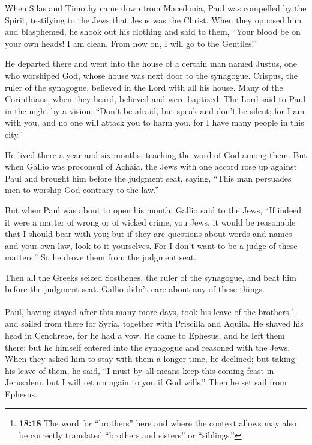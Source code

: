  When Silas and Timothy came down from Macedonia, Paul was
compelled by the Spirit, testifying to the Jews that Jesus was the
Christ.  When they opposed him and blasphemed, he shook
out his clothing and said to them, ``Your blood be on your own heads! I
am clean. From now on, I will go to the Gentiles!''

 He departed there and went into the house of a certain
man named Justus, one who worshiped God, whose house was next door to
the synagogue.  Crispus, the ruler of the synagogue,
believed in the Lord with all his house. Many of the Corinthians, when
they heard, believed and were baptized.  The Lord said to
Paul in the night by a vision, ``Don't be afraid, but speak and don't be
silent;  for I am with you, and no one will attack you to
harm you, for I have many people in this city.''

 He lived there a year and six months, teaching the word
of God among them.  But when Gallio was proconsul of
Achaia, the Jews with one accord rose up against Paul and brought him
before the judgment seat,  saying, ``This man persuades
men to worship God contrary to the law.''

 But when Paul was about to open his mouth, Gallio said
to the Jews, ``If indeed it were a matter of wrong or of wicked crime,
you Jews, it would be reasonable that I should bear with you;
 but if they are questions about words and names and your
own law, look to it yourselves. For I don't want to be a judge of these
matters.''  So he drove them from the judgment seat.

 Then all the Greeks seized Sosthenes, the ruler of the
synagogue, and beat him before the judgment seat. Gallio didn't care
about any of these things.

 Paul, having stayed after this many more days, took his
leave of the brothers,\footnote{\textbf{18:18} The word for ``brothers''
  here and where the context allows may also be correctly translated
  ``brothers and sisters'' or ``siblings.''} and sailed from there for
Syria, together with Priscilla and Aquila. He shaved his head in
Cenchreae, for he had a vow.  He came to Ephesus, and he
left them there; but he himself entered into the synagogue and reasoned
with the Jews.  When they asked him to stay with them a
longer time, he declined;  but taking his leave of them,
he said, ``I must by all means keep this coming feast in Jerusalem, but
I will return again to you if God wills.'' Then he set sail from
Ephesus.

